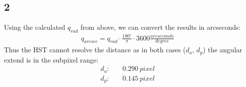 \documentclass[11pt,a4paper,twoside]{article}
\begin{document}
\subsection*{2}
Using the calculated $q_{rad}$ from above, we can convert the results in 
arcseconds:
\begin{align}
    q_{arcsec} = q_{rad} \cdot \frac{\ang{180}}{\pi} \cdot 3600 
                 \frac{\si{arcseconds}}{\si{degree}}
\end{align}
Thus the HST cannot resolve the distance as in both cases ($d_a$, $d_p$) the
angular extend is in the subpixel range:
\begin{align}
    d_a: &\quad \SI{0.290}{pixel} \\
    d_p: &\quad \SI{0.145}{pixel}
\end{align}
\end{document}
